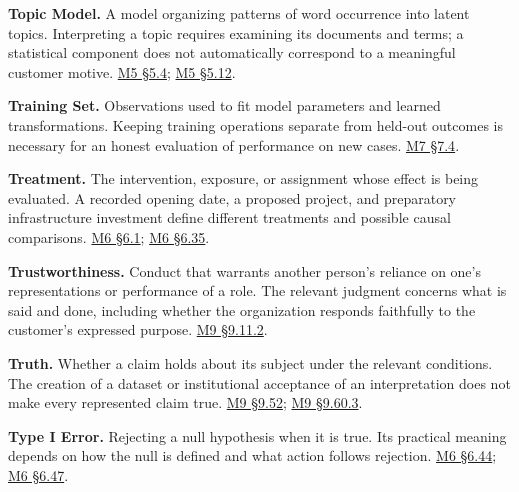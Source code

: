 \noindent\textbf{Topic Model.} A model organizing patterns of word occurrence
into latent topics. Interpreting a topic requires examining its
documents and terms; a statistical component does not automatically
correspond to a meaningful customer motive.
\href{Marketing_Analytics_Lecture_Notes.pdf\#M05-sentiment-aspect-labels-and-topic-models}{M5
§5.4};
\href{Marketing_Analytics_Lecture_Notes.pdf\#M05-mhealth-text-topics-and-their-denominators}{M5
§5.12}.

\noindent\textbf{Training Set.} Observations used to fit model parameters and
learned transformations. Keeping training operations separate from
held-out outcomes is necessary for an honest evaluation of performance
on new cases.
\href{Marketing_Analytics_Lecture_Notes.pdf\#M07-validation-cross-validation-and-leakage}{M7
§7.4}.

\noindent\textbf{Treatment.} The intervention, exposure, or assignment whose
effect is being evaluated. A recorded opening date, a proposed project,
and preparatory infrastructure investment define different treatments
and possible causal comparisons.
\href{Marketing_Analytics_Lecture_Notes.pdf\#M06-define-the-treatment-outcome-and-estimand}{M6
§6.1};
\href{Marketing_Analytics_Lecture_Notes.pdf\#M06-institutional-exposure-and-the-meaning-of-an-untreated-utility}{M6
§6.35}.

\noindent\textbf{Trustworthiness.} Conduct that warrants another person's
reliance on one's representations or performance of a role. The relevant
judgment concerns what is said and done, including whether the
organization responds faithfully to the customer's expressed purpose.
\hyperref[M09-trustworthiness-and-the-responsibilities-of-a-role]{M9
§9.11.2}.

\noindent\textbf{Truth.} Whether a claim holds about its subject under the
relevant conditions. The creation of a dataset or institutional
acceptance of an interpretation does not make every represented claim
true.
\hyperref[M09-truth-warrant-and-the-different-force-of-norms]{M9
§9.52};
\hyperref[M09-created-objects-and-independent-truth-conditions]{M9
§9.60.3}.

\noindent\textbf{Type I Error.} Rejecting a null hypothesis when it is true. Its
practical meaning depends on how the null is defined and what action
follows rejection.
\href{Marketing_Analytics_Lecture_Notes.pdf\#M06-type-i-and-type-ii-errors-under-unequal-costs}{M6
§6.44};
\href{Marketing_Analytics_Lecture_Notes.pdf\#M06-choosing-the-null-for-a-claim-about-harm}{M6
§6.47}.

